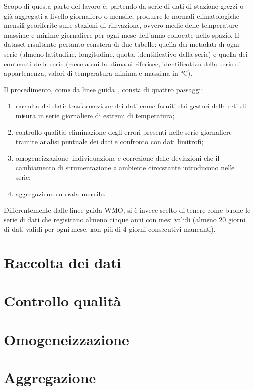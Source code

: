
Scopo di questa parte del lavoro è, partendo da serie di dati di stazione grezzi o già aggregati a livello giornaliero o mensile, produrre le normali climatologiche mensili georiferite sulle stazioni di rilevazione, ovvero medie delle temperature massime e minime giornaliere per ogni mese dell'anno collocate nello spazio. Il dataset risultante pertanto consterà di due tabelle: quella dei metadati di ogni serie (almeno latitudine, longitudine, quota, identificativo della serie) e quella dei contenuti delle serie (mese a cui la stima si riferisce, identificativo della serie di appartenenza, valori di temperatura minima e massima in \(\unit{\degreeCelsius}\)).

Il procedimento, come da linee guida~\cite{WMOGuidelinesNormalsCalculation2017}, consta di quattro passaggi:

\begin{enumerate}
  \item raccolta dei dati: trasformazione dei dati come forniti dai gestori
    delle reti di misura in serie giornaliere di estremi di temperatura;
  \item controllo qualità: eliminazione degli errori presenti nelle serie
    giornaliere tramite analisi puntuale dei dati e confronto con dati
    limitrofi;
  \item omogeneizzazione: individuazione e correzione delle deviazioni che il
    cambiamento di strumentazione o ambiente circostante introducono nelle
    serie;
  \item aggregazione su scala mensile.
\end{enumerate}

Differentemente dalle linee guida WMO, si è invece scelto di tenere come buone le serie di dati che registrano almeno cinque anni con mesi validi (almeno 20 giorni di dati validi per ogni mese, non più di 4 giorni consecutivi mancanti).

\section{Raccolta dei dati}\label{ch:raccolta-dati}


\section{Controllo qualità}\label{ch:qc}


\section{Omogeneizzazione}\label{ch:homo}


\section{Aggregazione}\label{ch:aggregazione}
